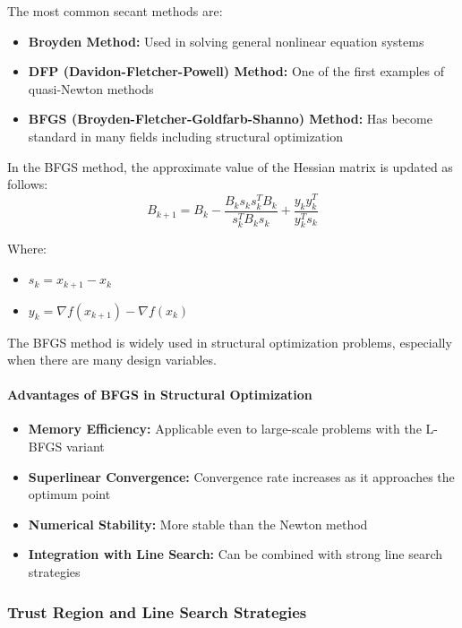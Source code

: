The most common secant methods are:
\begin{itemize}
    \item \textbf{Broyden Method:} Used in solving general nonlinear equation systems
    \item \textbf{DFP (Davidon-Fletcher-Powell) Method:} One of the first examples of quasi-Newton methods
    \item \textbf{BFGS (Broyden-Fletcher-Goldfarb-Shanno) Method:} Has become standard in many fields including structural optimization
\end{itemize}

In the BFGS method, the approximate value of the Hessian matrix is updated as follows:
\begin{equation}
B_{k+1} = B_k - \frac{B_k s_k s_k^T B_k}{s_k^T B_k s_k} + \frac{y_k y_k^T}{y_k^T s_k}
\end{equation}

Where:
\begin{itemize}
    \item $s_k = x_{k+1} - x_k$
    \item $y_k = \nabla f(x_{k+1}) - \nabla f(x_k)$
\end{itemize}

The BFGS method is widely used in structural optimization problems, especially when there are many design variables.

\paragraph{Advantages of BFGS in Structural Optimization}
\begin{itemize}
    \item \textbf{Memory Efficiency:} Applicable even to large-scale problems with the L-BFGS variant
    \item \textbf{Superlinear Convergence:} Convergence rate increases as it approaches the optimum point
    \item \textbf{Numerical Stability:} More stable than the Newton method
    \item \textbf{Integration with Line Search:} Can be combined with strong line search strategies
\end{itemize}

\subsubsection{Trust Region and Line Search Strategies}

